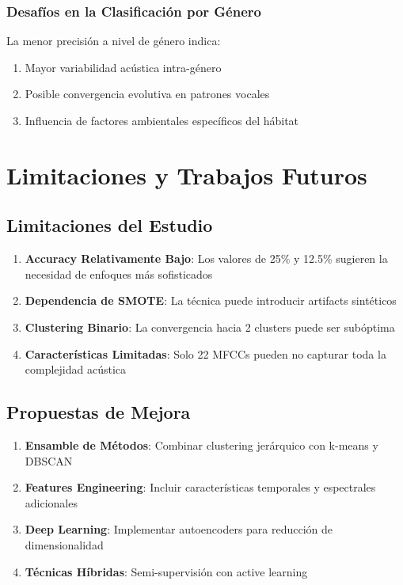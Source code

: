 \documentclass[12pt,a4paper]{article}
\begin{document}
\subsubsection{Desafíos en la Clasificación por Género}
La menor precisión a nivel de género indica:
\begin{enumerate}
    \item Mayor variabilidad acústica intra-género
    \item Posible convergencia evolutiva en patrones vocales
    \item Influencia de factores ambientales específicos del hábitat
\end{enumerate}

\section{Limitaciones y Trabajos Futuros}

\subsection{Limitaciones del Estudio}
\begin{enumerate}
    \item \textbf{Accuracy Relativamente Bajo}: Los valores de 25\% y 12.5\% sugieren la necesidad de enfoques más sofisticados
    \item \textbf{Dependencia de SMOTE}: La técnica puede introducir artifacts sintéticos
    \item \textbf{Clustering Binario}: La convergencia hacia 2 clusters puede ser subóptima
    \item \textbf{Características Limitadas}: Solo 22 MFCCs pueden no capturar toda la complejidad acústica
\end{enumerate}

\subsection{Propuestas de Mejora}
\begin{enumerate}
    \item \textbf{Ensamble de Métodos}: Combinar clustering jerárquico con k-means y DBSCAN
    \item \textbf{Features Engineering}: Incluir características temporales y espectrales adicionales
    \item \textbf{Deep Learning}: Implementar autoencoders para reducción de dimensionalidad
    \item \textbf{Técnicas Híbridas}: Semi-supervisión con active learning
\end{enumerate}
\end{document}
